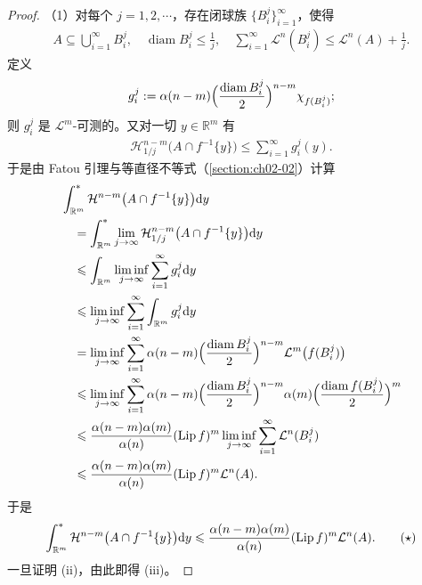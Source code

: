 \documentclass[../../main.tex]{subfiles}%
\begin{document}
\begin{proof}
（1）对每个 $j=1,2,\cdots$，存在闭球族 $\{B_i^j\}_{i=1}^{\infty}$，使得
\begin{align*}
A\subseteq\bigcup_{i=1}^{\infty}B_i^j,\quad\operatorname{diam}B_i^j\leqslant\frac{1}{j},\quad\sum_{i=1}^{\infty}\mathcal{L}^n(B_i^j)\leqslant\mathcal{L}^n(A)+\frac{1}{j}.
\end{align*}
定义
\begin{align*}
g_i^j:=\alpha(n-m)\Bigl(\frac{\operatorname{diam}B_i^j}{2}\Bigr)^{n-m}\chi_{f(B_i^j)};
\end{align*}
则 $g_i^j$ 是 $\mathcal{L}^m$-可测的。又对一切 $y\in\mathbb{R}^m$ 有
\begin{align*}
\mathcal{H}^{n-m}_{1/j}\bigl(A\cap f^{-1}\{y\}\bigr)\leqslant\sum_{i=1}^{\infty}g_i^j(y).
\end{align*}
于是由 Fatou 引理与等直径不等式（\cref{section:ch02-02}）计算%
\begin{align*}
&\int^{*}_{\mathbb{R}^m}\mathcal{H}^{n-m}\bigl(A\cap f^{-1}\{y\}\bigr)\mathrm{d} y\\
&\quad=\int^{*}_{\mathbb{R}^m}\lim_{j\to\infty}\mathcal{H}^{n-m}_{1/j}\bigl(A\cap f^{-1}\{y\}\bigr)\mathrm{d} y\\
&\quad\leqslant\int_{\mathbb{R}^m}\liminf_{j\to\infty}\sum_{i=1}^{\infty}g_i^j\mathrm{d} y\\
&\quad\leqslant\liminf_{j\to\infty}\sum_{i=1}^{\infty}\int_{\mathbb{R}^m}g_i^j\mathrm{d} y\\
&\quad=\liminf_{j\to\infty}\sum_{i=1}^{\infty}\alpha(n-m)\Bigl(\frac{\operatorname{diam}B_i^j}{2}\Bigr)^{n-m}\mathcal{L}^m\bigl(f(B_i^j)\bigr)\\
&\quad\leqslant\liminf_{j\to\infty}\sum_{i=1}^{\infty}\alpha(n-m)\Bigl(\frac{\operatorname{diam}B_i^j}{2}\Bigr)^{n-m}\alpha(m)\Bigl(\frac{\operatorname{diam}f(B_i^j)}{2}\Bigr)^{m}\\
&\quad\leqslant\frac{\alpha(n-m)\alpha(m)}{\alpha(n)}(\operatorname{Lip} f)^m\liminf_{j\to\infty}\sum_{i=1}^{\infty}\mathcal{L}^n(B_i^j)\\
&\quad\leqslant\frac{\alpha(n-m)\alpha(m)}{\alpha(n)}(\operatorname{Lip} f)^m\mathcal{L}^n(A).
\end{align*}
于是
\begin{align*}
\int^{*}_{\mathbb{R}^m}\mathcal{H}^{n-m}\bigl(A\cap f^{-1}\{y\}\bigr)\mathrm{d} y\leqslant\frac{\alpha(n-m)\alpha(m)}{\alpha(n)}(\operatorname{Lip} f)^m\mathcal{L}^n(A).\qquad(\star)
\end{align*}
一旦证明 (ii)，由此即得 (iii)。


\end{proof}
\end{document}
